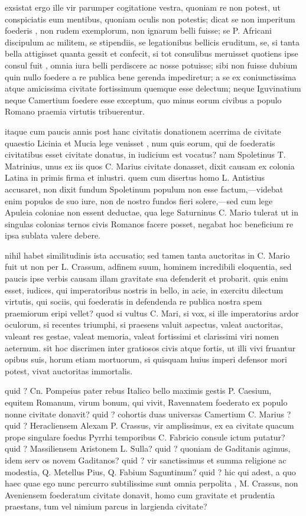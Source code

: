  exsistat ergo ille vir parumper cogitatione vestra, quoniam re non potest, ut conspiciatis eum mentibus, quoniam oculis non potestis; dicat se non imperitum foederis , non rudem exemplorum, non ignarum belli fuisse; se P. Africani discipulum ac militem, se stipendiis, se legationibus bellicis eruditum, se, si tanta bella attigisset quanta gessit et confecit, si tot consulibus meruisset quotiens ipse consul fuit , omnia iura belli perdiscere ac nosse potuisse; sibi non fuisse dubium quin nullo foedere a re publica bene gerenda impediretur; a se ex coniunctissima atque amicissima civitate fortissimum quemque esse delectum; neque Iguvinatium neque Camertium foedere esse exceptum, quo minus eorum civibus a populo Romano praemia virtutis tribuerentur.

 itaque cum paucis annis post hanc civitatis donationem acerrima de civitate quaestio Licinia et Mucia lege venisset , num quis eorum, qui de foederatis civitatibus esset civitate donatus, in iudicium est vocatus? nam Spoletinus T. Matrinius, unus ex iis quos C. Marius civitate donasset, dixit causam ex colonia Latina in primis firma et inlustri. quem cum disertus homo L. Antistius accusaret, non dixit fundum Spoletinum populum non esse factum,—videbat enim populos de suo iure, non de nostro fundos fieri solere,—sed cum lege Apuleia coloniae non essent deductae, qua lege Saturninus C. Mario tulerat ut in singulas colonias ternos civis Romanos facere posset, negabat hoc beneficium re ipsa sublata valere debere.

 nihil habet similitudinis ista accusatio; sed tamen tanta auctoritas in C. Mario fuit ut non per L. Crassum, adfinem suum, hominem incredibili eloquentia, sed paucis ipse verbis causam illam gravitate sua defenderit et probarit. quis enim esset, iudices, qui imperatoribus nostris in bello, in acie, in exercitu dilectum virtutis, qui sociis, qui foederatis in defendenda re publica nostra spem praemiorum eripi vellet? quod si vultus C. Mari, si vox, si ille imperatorius ardor oculorum, si recentes triumphi, si praesens valuit aspectus, valeat auctoritas, valeant res gestae, valeat memoria, valeat fortissimi et clarissimi viri nomen aeternum. sit hoc discrimen inter gratiosos civis atque fortis, ut illi vivi fruantur opibus suis, horum etiam mortuorum, si quisquam huius imperi defensor mori potest, vivat auctoritas immortalis.

 quid ? Cn. Pompeius pater rebus Italico bello maximis gestis P. Caesium, equitem Romanum, virum bonum, qui vivit, Ravennatem foederato ex populo nonne civitate donavit? quid ? cohortis duas universas Camertium C. Marius ? quid ? Heracliensem Alexam P. Crassus, vir amplissimus, ex ea civitate quacum prope singulare foedus Pyrrhi temporibus C. Fabricio consule ictum putatur? quid ? Massiliensem Aristonem L. Sulla? quid ? quoniam de Gaditanis agimus, idem serv os novem Gaditanos? quid ? vir sanctissimus et summa religione ac modestia, Q. Metellus Pius, Q. Fabium Saguntinum? quid ? hic qui adest, a quo haec quae ego nunc percurro subtilissime sunt omnia perpolita , M. Crassus, non Aveniensem foederatum civitate donavit, homo cum gravitate et prudentia praestans, tum vel nimium parcus in largienda civitate?

